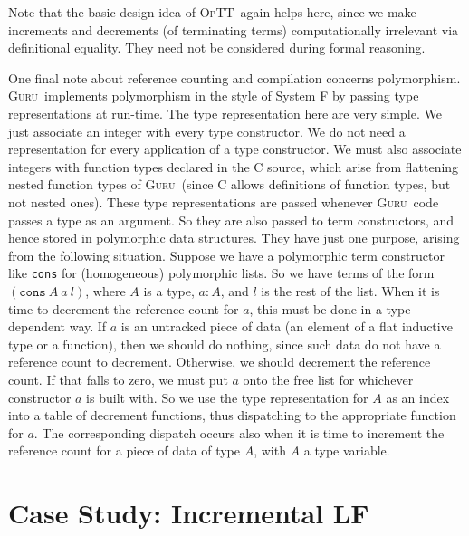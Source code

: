 \documentclass[preprint,natbib]{sigplanconf}
\newcommand{\optt}{\textsc{OpTT}}
\newcommand{\guru}[0]{\textsc{Guru}}
\begin{document}
Note that the basic design idea of \optt\ again helps here, since we
make increments and decrements (of terminating terms) computationally
irrelevant via definitional equality.  They need not be considered
during formal reasoning.

One final note about reference counting and compilation concerns
polymorphism.  \guru\ implements polymorphism in the style of System F
by passing type representations at run-time.  The type representation
here are very simple.  We just associate an integer with every type
constructor.  We do not need a representation for every application of
a type constructor.  We must also associate integers with function
types declared in the C source, which arise from flattening nested
function types of \guru\ (since C allows definitions of function
types, but not nested ones).  These type representations are passed
whenever \guru\ code passes a type as an argument.  So they are also
passed to term constructors, and hence stored in polymorphic data
structures.  They have just one purpose, arising from the following
situation.  Suppose we have a polymorphic term constructor like
\texttt{cons} for (homogeneous) polymorphic lists.  So we have terms
of the form $(\texttt{cons}\ A\ a\ l)$, where $A$ is a type, $a:A$,
and $l$ is the rest of the list.  When it is time to decrement the
reference count for $a$, this must be done in a type-dependent way.
If $a$ is an untracked piece of data (an element of a flat inductive
type or a function), then we should do nothing, since such data do not
have a reference count to decrement.  Otherwise, we should decrement
the reference count.  If that falls to zero, we must put $a$ onto the
free list for whichever constructor $a$ is built with.  So we use the
type representation for $A$ as an index into a table of decrement
functions, thus dispatching to the appropriate function for $a$.  The
corresponding dispatch occurs also when it is time to increment the
reference count for a piece of data of type $A$, with $A$ a type
variable.

\section{Case Study: Incremental LF}
\label{sec:golfsock}
\end{document}
